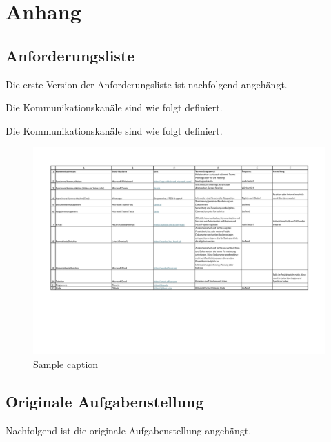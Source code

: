 \newpage
\section*{Anhang}

\subsection*{Anforderungsliste}

Die erste Version der Anforderungsliste ist nachfolgend angehängt.





\newpage

Die Kommunikationskanäle sind wie folgt definiert.


\begin{landscape}
Die Kommunikationskanäle sind wie folgt definiert.

\begin{figure}[h]
\centering
\includegraphics[width=260mm]{assets/Kommunikationschnittstellen.pdf}
\caption{Sample caption}
\label{fig:hslu-logo}
\end{figure}
\end{landscape}

\newpage

\subsection*{Originale Aufgabenstellung}

Nachfolgend ist die originale Aufgabenstellung angehängt.


